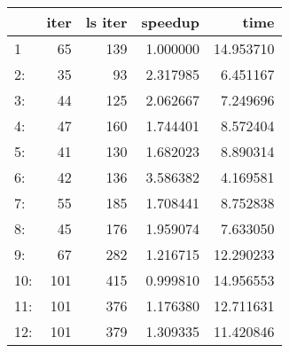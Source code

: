\begin{tabular}{lrrrr}
\toprule
{} &  iter &  ls iter &   speedup &       time \\
\midrule
1   &    65 &      139 &  1.000000 &  14.953710 \\
2:  &    35 &       93 &  2.317985 &   6.451167 \\
3:  &    44 &      125 &  2.062667 &   7.249696 \\
4:  &    47 &      160 &  1.744401 &   8.572404 \\
5:  &    41 &      130 &  1.682023 &   8.890314 \\
6:  &    42 &      136 &  3.586382 &   4.169581 \\
7:  &    55 &      185 &  1.708441 &   8.752838 \\
8:  &    45 &      176 &  1.959074 &   7.633050 \\
9:  &    67 &      282 &  1.216715 &  12.290233 \\
10: &   101 &      415 &  0.999810 &  14.956553 \\
11: &   101 &      376 &  1.176380 &  12.711631 \\
12: &   101 &      379 &  1.309335 &  11.420846 \\
\bottomrule
\end{tabular}

